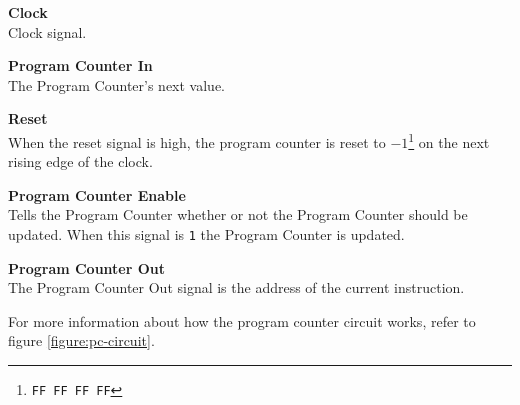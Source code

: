 \begin{description}
\item{\textbf{Clock}} \\

Clock signal.

\item{\textbf{Program Counter In}} \\

The Program Counter's next value.

\item{\textbf{Reset}} \\

When the reset signal is high, the program counter is reset to $-1$\footnote{\texttt{FF FF FF FF}} on the next rising edge of the clock.

\item{\textbf{Program Counter Enable}} \\

Tells the Program Counter whether or not the Program Counter should be updated.
When this signal is \texttt{1} the Program Counter is updated.

\end{description}


\begin{description}
\item{\textbf{Program Counter Out}} \\

The Program Counter Out signal is the address of the current instruction.

\end{description}

For more information about how the program counter circuit works, refer to figure \vref{figure:pc-circuit}.
